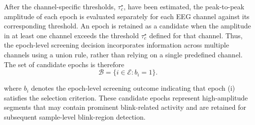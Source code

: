 After the channel-specific thresholds, \(\tau_c^\star\), have been estimated, the peak-to-peak amplitude of each epoch is evaluated separately for each EEG channel against its corresponding threshold.
An epoch is retained as a candidate when the amplitude in at least one channel exceeds the threshold \(\tau_c^\star\) defined for that channel. Thus, the epoch-level screening decision incorporates information across multiple channels using a union rule, rather than relying on a single predefined channel. %
The set of candidate epochs is therefore
\begin{equation}
\mathcal{B}=\{i \in \mathcal{E}: b_i=1\}.
\end{equation}


where  \(b_i\) denotes the epoch-level screening outcome indicating that epoch (i) satisfies the selection criterion. These candidate epochs represent high-amplitude segments that may contain prominent blink-related activity and are retained for subsequent sample-level blink-region detection.


